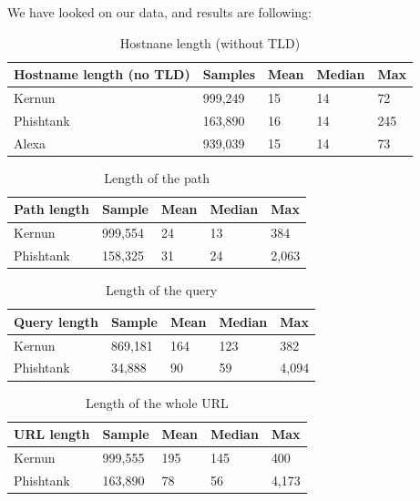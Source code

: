 \documentclass[
  digital, %
  oneside, %
  table,   %
  nolof,     %
  nolot,     %
]{fithesis3}
\begin{document}
We have looked on our data, and results are following:

\begin{table}[h!]
\begin{tabular}{l|llll}
\multicolumn{1}{c|}{Hostname length (no TLD)} & Samples & Mean & Median & Max \\ \hline
Kernun                                        & 999,249  & 15   & 14     & 72  \\
Phishtank                                     & 163,890  & 16   & 14     & 245 \\
Alexa                                         & 939,039  & 15   & 14     & 73 
\end{tabular}
\caption{Hostnane length (without TLD)}
\label{table:hostname-length}
\end{table}

\begin{table}[h!]
\begin{tabular}{l|llll}
\multicolumn{1}{c|}{Path length} & Sample  & Mean & Median & Max   \\ \hline
Kernun                    & 999,554 & 24   & 13     & 384   \\
Phishtank                 & 158,325 & 31   & 24     & 2,063
\end{tabular}
\caption{Length of the path}
\label{table:path-length}
\end{table}

\begin{table}[h!]
\begin{tabular}{l|llll}
\multicolumn{1}{c|}{Query length} & Sample  & Mean & Median & Max   \\ \hline
Kernun                            & 869,181 & 164  & 123    & 382   \\
Phishtank                         & 34,888  & 90   & 59     & 4,094
\end{tabular}
\caption{Length of the query}
\label{table:query-length}
\end{table}

\begin{table}[]
\begin{tabular}{l|llll}
\multicolumn{1}{c|}{URL length} & Sample  & Mean & Median & Max   \\ \hline
Kernun                          & 999,555 & 195  & 145    & 400   \\
Phishtank                       & 163,890 & 78   & 56     & 4,173
\end{tabular}
\caption{Length of the whole URL}
\label{table:URL-length}
\end{table}
\end{document}
